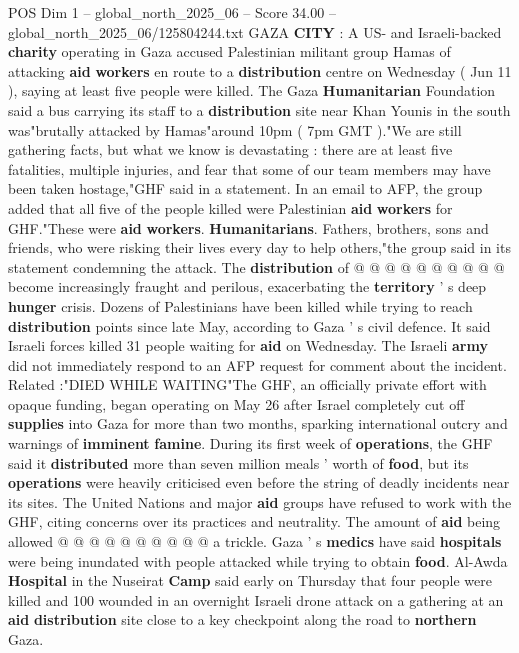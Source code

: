 \begin{textsample}{POS Dim 1 – global\_north\_2025\_06 – Score 34.00 – global\_north\_2025\_06/125804244.txt}  \label{ex:f1_pos_305}
GAZA \textbf{CITY} : A US- and Israeli-backed \textbf{charity} operating in Gaza accused Palestinian militant group Hamas of attacking \textbf{aid} \textbf{workers} en route to a \textbf{distribution} centre on Wednesday ( Jun 11 ), saying at least five people were killed.
The Gaza \textbf{Humanitarian} Foundation said a bus carrying its staff to a \textbf{distribution} site near Khan Younis in the south was"brutally attacked by Hamas"around 10pm ( 7pm GMT )."We are still gathering facts, but what we know is devastating : there are at least five fatalities, multiple injuries, and fear that some of our team members may have been taken hostage,"GHF said in a statement.
In an email to AFP, the group added that all five of the people killed were Palestinian \textbf{aid} \textbf{workers} for GHF."These were \textbf{aid} \textbf{workers}. \textbf{Humanitarians}.
Fathers, brothers, sons and friends, who were risking their lives every day to help others,"the group said in its statement condemning the attack.
The \textbf{distribution} of @ @ @ @ @ @ @ @ @ @ become increasingly fraught and perilous, exacerbating the \textbf{territory} ' s deep \textbf{hunger} crisis.
Dozens of Palestinians have been killed while trying to reach \textbf{distribution} points since late May, according to Gaza ' s civil defence.
It said Israeli forces killed 31 people waiting for \textbf{aid} on Wednesday.
The Israeli \textbf{army} did not immediately respond to an AFP request for comment about the incident.
Related :"DIED WHILE WAITING"The GHF, an officially private effort with opaque funding, began operating on May 26 after Israel completely cut off \textbf{supplies} into Gaza for more than two months, sparking international outcry and warnings of \textbf{imminent} \textbf{famine}.
During its first week of \textbf{operations}, the GHF said it \textbf{distributed} more than seven million meals ' worth of \textbf{food}, but its \textbf{operations} were heavily criticised even before the string of deadly incidents near its sites.
The United Nations and major \textbf{aid} groups have refused to work with the GHF, citing concerns over its practices and neutrality.
The amount of \textbf{aid} being allowed @ @ @ @ @ @ @ @ @ @ a trickle.
Gaza ' s \textbf{medics} have said \textbf{hospitals} were being inundated with people attacked while trying to obtain \textbf{food}.
Al-Awda \textbf{Hospital} in the Nuseirat \textbf{Camp} said early on Thursday that four people were killed and 100 wounded in an overnight Israeli drone attack on a gathering at an \textbf{aid} \textbf{distribution} site close to a key checkpoint along the road to \textbf{northern} Gaza.

\end{textsample}
